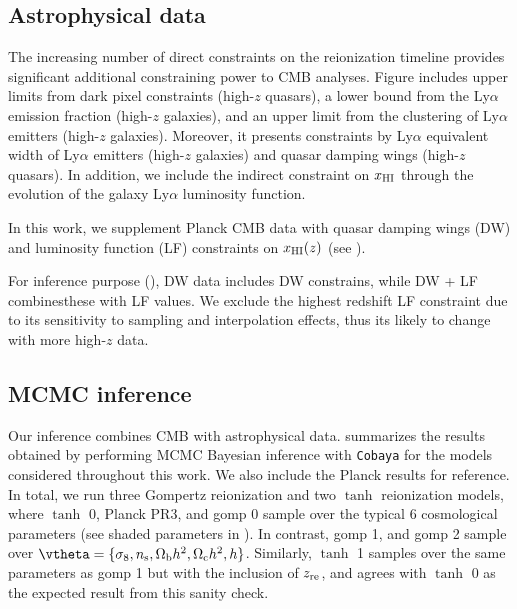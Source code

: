 \subsection*{Astrophysical data}
\label{ssec:xHI}
The increasing number of direct constraints on the reionization timeline
provides significant additional constraining power to CMB analyses. Figure
 includes upper limits from dark pixel constraints\cite{Jin2023} 
(high-$z$ quasars), a lower bound from the Ly$\alpha$ emission 
fraction\cite{Mesinger2015} (high-$z$ galaxies), and an upper limit from the
clustering of Ly$\alpha$ emitters\cite{Sobacchi2015} (high-$z$ galaxies).
Moreover, it presents constraints by Ly$\alpha$ equivalent width of Ly$\alpha$ 
emitters\cite{Mason2018, Mason2018,  Hoag2019} (high-$z$ galaxies) and 
quasar damping wings\cite{Greig2022, Greig2024, Spina2024, Durovcikova2024} 
(high-$z$ quasars). In addition, we include the indirect constraint on $x_{\mathrm{HI}}$ 
through the evolution of the galaxy Ly$\alpha$ luminosity function\cite{Morales2021}.

In this work, we supplement Planck CMB data with quasar damping wings (DW) 
and luminosity function (LF) constraints on $x_{\mathrm{HI}} (z)$ (see ).

For  inference purpose (), DW data includes DW constrains, 
while DW + LF combinesthese with LF values. We exclude the highest redshift
LF constraint due to its sensitivity to sampling and interpolation effects, thus its 
likely to change with more high-$z$ data. 


\subsection*{MCMC inference}
\label{ssec:fits}
Our inference combines CMB with astrophysical data.  
summarizes the results obtained by performing MCMC
Bayesian inference with \texttt{Cobaya} for the models considered
throughout this work.
We also include the Planck results \cite{Planck2020a} for reference.
In total, we run three Gompertz reionization and two $\tanh$
reionization models, where $\tanh$ 0, Planck PR3, and gomp 0 sample over
the typical 6 cosmological parameters (see shaded parameters in
).
In contrast, gomp 1, and gomp 2 sample over $\vtheta = \{\sigma_8, \ns,
\Omegab h^2, \Omegac h^2, h\}$.
Similarly, $\tanh$ 1 samples over the same parameters as gomp 1 but with
the inclusion of $z_{\mathrm{re}}$, and agrees with $\tanh$ 0 as the expected
result from this sanity check.

